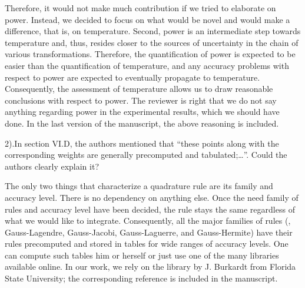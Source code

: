 \begin{authors}
Therefore, it would not make much contribution if we tried to elaborate on power.
Instead, we decided to focus on what would be novel and would make a difference, that is, on temperature.
Second, power is an intermediate step towards temperature and, thus, resides closer to the sources of uncertainty in the chain of various transformations.
Therefore, the quantification of power is expected to be easier than the quantification of temperature, and any accuracy problems with respect to power are expected to eventually propagate to temperature.
Consequently, the assessment of temperature allows us to draw reasonable conclusions with respect to power.
The reviewer is right that we do not say anything regarding power in the experimental results, which we should have done.
In the last version of the manuscript, the above reasoning is included.
\end{authors}

\begin{reviewer}
2).In section VI.D, the authors mentioned that “these points along with the corresponding weights are generally precomputed and tabulated;…”. Could the authors clearly explain it?
\end{reviewer}
\begin{authors}
The only two things that characterize a quadrature rule are its family and accuracy level.
There is no dependency on anything else.
Once the need family of rules and accuracy level have been decided, the rule stays the same regardless of what we would like to integrate.
Consequently, all the major families of rules (\eg, Gauss-Lagendre, Gauss-Jacobi, Gauss-Laguerre, and Gauss-Hermite) have their rules precomputed and stored in tables for wide ranges of accuracy levels.
One can compute such tables him or herself or just use one of the many libraries available online.
In our work, we rely on the library by J. Burkardt from Florida State University; the corresponding reference is included in the manuscript.
\end{authors}

